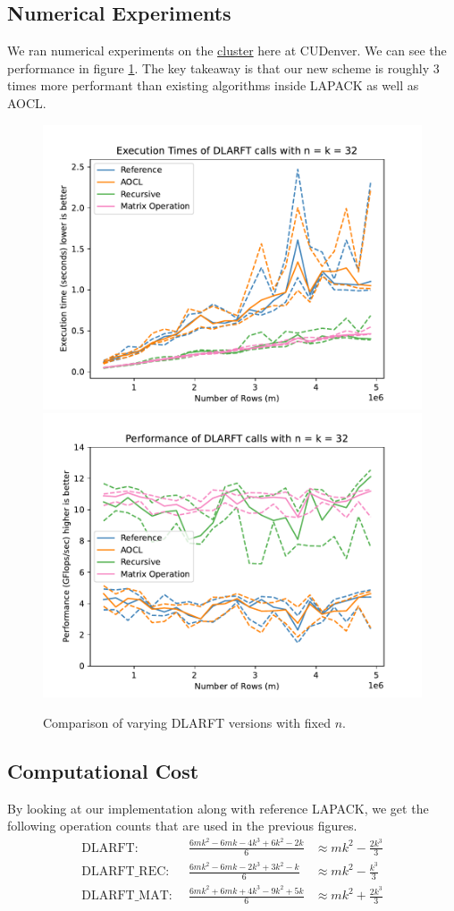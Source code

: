 \documentclass[12pt]{article}
\begin{document}
    \subsection{Numerical Experiments}
    We ran numerical experiments on the \href{https://ccm-docs.readthedocs.io/en/latest/alderaan/#hardware}{cluster}
    here at CUDenver. We can see the performance in figure \ref{fig:DLARFT}. The key takeaway is that our new
    scheme is roughly 3 times more performant than existing algorithms inside LAPACK as well as AOCL.
    \begin{figure}
        \centering
        \includegraphics[width=.45\textwidth]{figures/timeDLARFT.pdf}
        \includegraphics[width=.45\textwidth]{figures/flopDLARFT.pdf}
        \caption{Comparison of varying DLARFT versions with fixed $n$.}\label{fig:DLARFT}
    \end{figure}
    \subsection{Computational Cost}
    By looking at our implementation along with reference LAPACK, we get the following operation counts that are
    used in the previous figures.
    \[
    \begin{aligned}
            \text{DLARFT: }&\,      \frac{6mk^2 - 6mk -4k^3 +6k^2 - 2k}{6}&\approx mk^2 - \frac{2k^3}{3}\\
            \text{DLARFT\_REC: }&\, \frac{6mk^2 - 6mk -2k^3 +3k^2 -  k}{6}&\approx mk^2 - \frac{k^3}{3}\\
            \text{DLARFT\_MAT: }&\, \frac{6mk^2 + 6mk +4k^3 -9k^2 + 5k}{6}&\approx mk^2 + \frac{2k^3}{3}
    \end{aligned}
    \]
\end{document}
